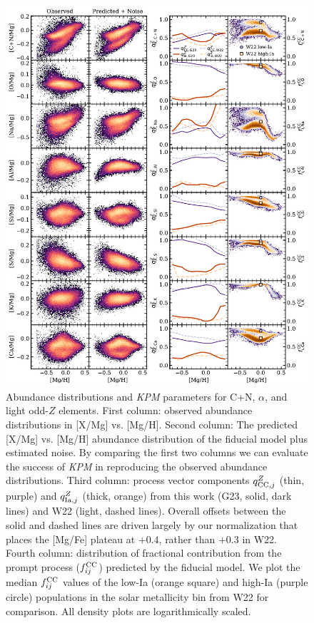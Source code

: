 \documentclass[modern, linenumbers]{aastex631}
\newcommand{\qcc}{q_{{\rm CC,}j}^{Z}}
\newcommand{\qIa}{q_{{\rm Ia,}j}^{Z}}
\newcommand{\fcc}{f_{ij}^{\rm CC}}
\newcommand{\name}{\textsl{KPM}}
\begin{document}
\begin{figure}[htb!]
    \centering
    \includegraphics[width=\textwidth]{Paper/Figures/all_param1.pdf}
    \caption{Abundance distributions and \name{} parameters for C+N, $\alpha$, and light odd-$Z$ elements. First column: observed abundance distributions in [X/Mg] vs. [Mg/H]. Second column: The predicted [X/Mg] vs. [Mg/H] abundance distribution of the fiducial model plus estimated noise. By comparing the first two columns we can evaluate the success of \name{} in reproducing the observed abundance distributions. Third column: process vector components $\qcc$ (thin, purple) and $\qIa$ (thick, orange) from this work (G23, solid, dark lines) and W22 (light, dashed lines). Overall offsets between the solid and dashed lines are driven largely by our normalization that places the [Mg/Fe] plateau at $+0.4$, rather than $+0.3$ in W22. Fourth column: distribution of fractional contribution from the prompt process ($\fcc$) predicted by the fiducial model. We plot the median $\fcc$ values of the low-Ia (orange square) and high-Ia (purple circle) populations in the solar metallicity bin from W22 for comparison. All density plots are logarithmically scaled.}
    \label{fig:all_param1}
\end{figure}
\end{document}
